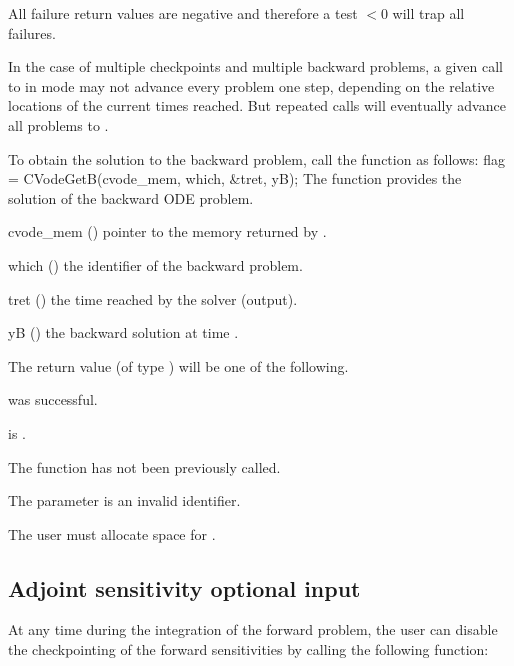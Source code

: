 {
  All failure return values are negative and therefore a test $< 0$
  will trap all  failures.

  In the case of multiple checkpoints and multiple backward problems, a given
  call to  in  mode may not advance every problem
  one step, depending on the relative locations of the current times reached.
  But repeated calls will eventually advance all problems to .
}
To obtain the solution  to the backward problem, call the function
 as follows:
{
  flag = CVodeGetB(cvode\_mem, which, \&tret, yB);
}
{
  The function  provides the solution  of the backward ODE
  problem.
}
{
  \begin{args}
  \item[cvode\_mem] ()
    pointer to the {\cvodes} memory returned by .
  \item[which] ()
    the identifier of the backward problem.
  \item[tret] ()
    the time reached by the solver (output).
  \item[yB] ()
    the backward solution at time .
  \end{args}
}
{
  The return value  (of type ) will be one of the following.
  \begin{args}
  \item[\Id{CV\_SUCCESS}] 
     was successful.
  \item[\Id{CV\_MEM\_NULL}] 
     is .
  \item[\Id{CV\_NO\_ADJ}]
    The function  has not been previously called.
   \item[\Id{CV\_ILL\_INPUT}]
    The parameter  is an invalid identifier.
  \end{args} 
}
{
  {\warn} The user must allocate space for .
}


\subsection{Adjoint sensitivity optional input}

At any time during the integration of the forward problem, the user can disable
the checkpointing of the forward sensitivities by calling the following function:

